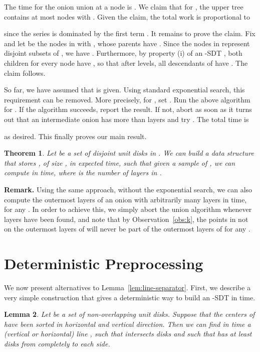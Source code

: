 \documentclass{paper}
\newtheorem{theorem}{Theorem}[section]
\newtheorem{lemma}[theorem]{Lemma}
\begin{document}
The time for the onion union at a node  is
. 
We claim that for , the upper tree
 contains at most  nodes  with .
Given the claim,  the 
total work is proportional to

since the series  is dominated by the
first term . It remains to prove the claim. Fix 
 and let  be the nodes
in  with , whose parents have
. Since the nodes in  represent disjoint subsets
of , we have . 
Furthermore, by property (i) of an -SDT ,
both children  for every node  
have , so that after  levels,
all descendants  of  have . The claim follows.

So far, we have assumed that  is given. Using standard exponential
search, this requirement can be removed. More precisely, 
for , set . Run the above algorithm 
for . If the algorithm
succeeds, report the result. If not, abort as soon as it turns
out that an intermediate onion has more than  layers and try
. The total time is 

as desired. This finally proves our main result.

\begin {theorem}
  Let  be a set of  disjoint unit disks in .
  We can build a data structure that stores , of size , 
  in  expected time, such that given a sample 
   of , we can compute 
   in  time, where  is the number of layers in
  .\hfill
\end {theorem}


\noindent\textbf{Remark.}
Using the same approach, without the exponential search, we can also 
compute the outermost  layers of an onion with arbitrarily many layers 
in  time, for any .
In order to achieve this, we simply abort the union algorithm whenever 
 layers have been found, and note that 
by Observation~\ref {obs:k},
the points in  not on the 
outermost  layers of  will never be part of the 
outermost  layers of  for any .

\section{Deterministic Preprocessing}\label{sec:derandomize}

We now present alternatives to Lemma~\ref{lem:line-separator}. 
First, we describe a very simple construction that
gives a deterministic way to build an -SDT
in  time.

\begin{lemma}
Let  be a set of  non-overlapping unit disks.
Suppose that the centers of  have been sorted in horizontal and vertical direction.
Then we can find in  time a (vertical or horizontal) line , such that
 intersects  disks and such that  has
at least  disks from  completely to each side.
\end{lemma}
\end{document}
